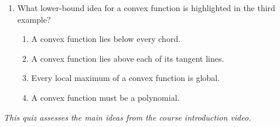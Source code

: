 \documentclass[10pt]{article}
\begin{document}
\begin{enumerate}
  \item What lower-bound idea for a convex function is highlighted in the third example?
  \begin{enumerate}
    \item A convex function lies below every chord.
    \item A convex function lies above each of its tangent lines.
    \item Every local maximum of a convex function is global.
    \item A convex function must be a polynomial.
  \end{enumerate}
\end{enumerate}

\vspace{0.7em}
\noindent\textit{This quiz assesses the main ideas from the course introduction video.}
\end{document}
